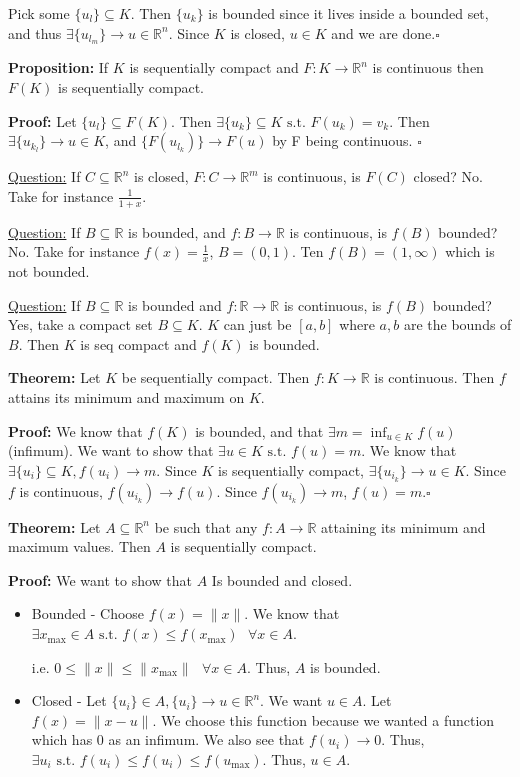\documentclass{article}
\newcommand*{\qed}{\hfill$\square$}%
\newcommand*{\txt}[1]{\text{ #1 }}%
\newcommand*{\fora}{\txt{}\forall}%
\newcommand*{\rr}{\mathbb{R}}%
\begin{document}
Pick some $\{u_l\}\subseteq K$. Then $\{u_k\}$ is bounded since it lives inside a bounded set, and thus $\exists \{u_{l_m}\}\to u\in \rr^n$. Since $K$ is closed, $u\in K$ and we are done.\qed

\textbf{Proposition:} If $K$ is sequentially compact and $F:K\to \rr^n$ is continuous then $F(K)$ is sequentially compact.

\textbf{Proof:} Let $\{u_l\}\subseteq F(K)$. Then $\exists \{u_k\}\subseteq K\txt{s.t.}F(u_k)=v_k$. Then $\exists \{u_{k_l}\}\to u\in K$, and $\{F(u_{l_k})\}\to F(u)$ by F being continuous. \qed

\underline{Question:} If $C\subseteq \rr^n$ is closed, $F:C\to \rr^m$ is continuous, is $F(C)$ closed? No. Take for instance $\frac{1}{1+x}$.

\underline{Question:} If $B\subseteq \rr$ is bounded, and $f:B\to \rr$ is continuous, is $f(B)$ bounded? No. Take for instance $f(x)=\frac{1}{x}$, $B=(0,1)$. Ten $f(B)=(1,\infty)$ which is not bounded.

\underline{Question:} If $B\subseteq \rr$ is bounded and $f:\rr\to \rr$ is continuous, is $f(B)$ bounded? Yes, take a compact set $B\subseteq K$. $K$ can just be $[a,b]$ where $a,b$ are the bounds of $B$. Then $K$ is seq compact and $f(K)$ is bounded.

\textbf{Theorem:} Let $K$ be sequentially compact. Then $f:K\to \rr$ is continuous. Then $f$ attains its minimum and maximum on $K$.

\textbf{Proof:} We know that $f(K)$ is bounded, and that $\exists m=\inf_{u\in K}f(u)$ (infimum). We want to show that $\exists u\in K\txt{s.t.}f(u)=m$. We know that $\exists \{u_i\}\subseteq K, f(u_i)\to m$. Since $K$ is sequentially compact, $\exists \{u_{i_k}\}\to u\in K$. Since $f$ is continuous, $f(u_{i_k})\to f(u)$. Since $f(u_{i_k})\to m$, $f(u)=m$.\qed

\textbf{Theorem:} Let $A\subseteq \rr^n$ be such that any $f:A\to \rr$ attaining its minimum and maximum values. Then $A$ is sequentially compact. 

\textbf{Proof:} We want to show that $A$ Is bounded and closed.\begin{itemize}
    \item Bounded - Choose $f(x)=\|x\|$. We know that $\exists x_{\text{max}}\in A\txt{s.t.}f(x)\leq f(x_{\text{max}})\fora x\in A$.
    
    i.e. $0\leq \|x\|\leq \|x_{\text{max}}\|\fora x\in A$. Thus, $A$ is bounded.
    \item Closed - Let $\{u_i\}\in A,\{u_i\}\to u\in \rr^n$. We want $u\in A$. Let $f(x)=\|x-u\|$. We choose this function because we wanted a function which has $0$ as an infimum. We also see that $f(u_i)\to 0$. Thus, $\exists u_i\txt{s.t.}f(u_i)\leq f(u_i)\leq f(u_{\text{max}})$. Thus, $u\in A$.
\end{itemize}
\end{document}
